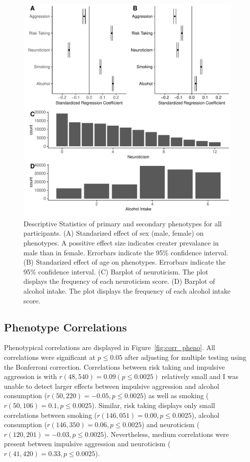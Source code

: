 \begin{figure}[htpb]
  \centering
  \includegraphics[width=0.8\linewidth]{ukb_assoc/figure/phenotype/descriptives_plots.pdf}
  \caption{
    Descriptive Statistics of primary and secondary phenotypes for all participants.
    (A) Standarized effect of sex (male, female) on phenotypes. 
    A possitive effect size indicates creater prevalance in male than in female.
    Errorbars indicate the 95\% confidence interval.
    (B) Standarized effect of age on phenotypes.
    Errorbars indicate the 95\% confidence interval.
    (C) Barplot of neuroticism.
    The plot displays the frequency of each neuroticism score.
    (D) Barplot of alcohol intake.
    The plot displays the frequency of each alcohol intake score.
  }\label{fig:disc}
\end{figure}

\subsection{Phenotype Correlations}
\label{sub:phenotype_correlations}

Phenotypical correlations are displayed in Figure~\ref{fig:corr_pheno}. 
All correlations were significant at $p\leq 0.05$ after adjusting for multiple testing using the Bonferroni correction.
Correlations between risk taking and impulsive aggression is with $r(48,540)=0.09 (p\leq0.0025)$ relatively small
and I was unable to detect larger effects between impulsive aggression and alcohol consumption ($r(50,220)=-0.05, p\leq0.0025$)
as well as smoking ($r(50,106)=0.1, p\leq0.0025$).
Similar, risk taking displays only small correlations between
smoking ($r(146,051)=0.00, p\leq0.0025$),
alcohol consumption ($r(146,350)=0.06, p\leq0.0025$)
and neuroticism ($r(120,201)=-0.03, p\leq0.0025$). 
Nevertheless, medium correlations were present between impulsive aggression and neuroticism ($r(41,420)=0.33, p\leq0.0025$).

